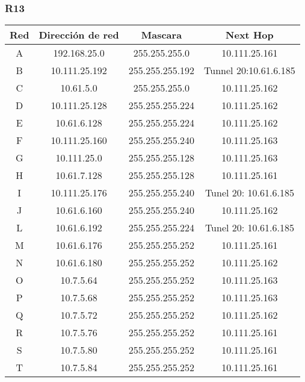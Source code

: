 \subsubsection{R13}
\begin{table}[!htbp]
\centering
  \begin{tabular}{|c|c|c|c|}
    \hline
	Red & Dirección de red & Mascara & Next Hop\\ \hline
	A & 192.168.25.0 & 255.255.255.0 & 10.111.25.161 \\ \hline
	B & 10.111.25.192 & 255.255.255.192 & Tunnel 20:10.61.6.185 \\ \hline
	C & 10.61.5.0 & 255.255.255.0 & 10.111.25.162 \\ \hline
	D & 10.111.25.128 & 255.255.255.224 & 10.111.25.162 \\ \hline
	E & 10.61.6.128 & 255.255.255.224 & 10.111.25.162 \\ \hline
	F & 10.111.25.160 & 255.255.255.240 & 10.111.25.163 \\ \hline
	G & 10.111.25.0 & 255.255.255.128 & 10.111.25.163 \\ \hline
	H & 10.61.7.128 & 255.255.255.128 & 10.111.25.161 \\ \hline
	I & 10.111.25.176 & 255.255.255.240 & Tunel 20: 10.61.6.185 \\ \hline
	J & 10.61.6.160 & 255.255.255.240 & 10.111.25.162 \\ \hline
	L & 10.61.6.192 & 255.255.255.224 & Tunel 20: 10.61.6.185 \\ \hline
	M & 10.61.6.176 & 255.255.255.252 & 10.111.25.161 \\ \hline
	N & 10.61.6.180 & 255.255.255.252 & 10.111.25.162 \\ \hline
	O & 10.7.5.64 & 255.255.255.252 & 10.111.25.163 \\ \hline
	P & 10.7.5.68 & 255.255.255.252 & 10.111.25.163 \\ \hline
	Q & 10.7.5.72 & 255.255.255.252 & 10.111.25.162 \\ \hline
	R & 10.7.5.76 & 255.255.255.252 & 10.111.25.161 \\ \hline
	S & 10.7.5.80 & 255.255.255.252 & 10.111.25.161 \\ \hline
	T & 10.7.5.84 & 255.255.255.252 & 10.111.25.161 \\ \hline
    \hline
  \end{tabular}
\end{table}

\newpage
